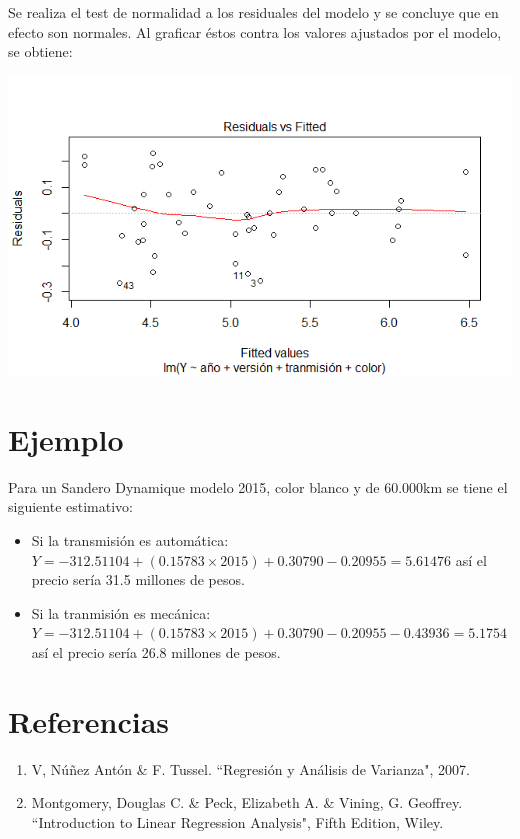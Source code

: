 \documentclass[12pt,a0,portrait]{a0poster}
\begin{document}
\begin{multicols}{2}
Se realiza el test de normalidad a los residuales del modelo y se concluye que en efecto son normales. Al graficar \'estos contra los valores ajustados por el modelo, se obtiene:
\begin{center}
	\includegraphics[scale=1.5]{Residuals}
\end{center}


\section*{\textcolor{ginger}{\huge Ejemplo}}
Para un Sandero Dynamique modelo 2015, color blanco y de $60.000$km se tiene el siguiente estimativo:\\
\begin{itemize}
	\item Si la transmisi\'on es autom\'atica:  $Y=-312.51104+(0.15783\times2015)+0.30790-0.20955 = 5.61476 $ as\'i el precio ser\'ia 31.5 millones de pesos.
	\item Si la tranmisi\'on es mec\'anica: $Y=-312.51104+(0.15783\times2015)+0.30790-0.20955-0.43936 = 5.1754 $ as\'i el precio ser\'ia 26.8 millones de pesos.
\end{itemize}


\section*{\textcolor{ginger}{\huge Referencias}}

\begin{enumerate}
	\item V, N\'u\~nez Ant\'on \& F. Tussel. ``Regresi\'on y An\'alisis de Varianza", 2007.
	\item Montgomery, Douglas C. \& Peck, Elizabeth A. \& Vining, G. Geoffrey. ``Introduction to Linear Regression Analysis", Fifth Edition, Wiley.
\end{enumerate}

\end{multicols}
\end{document}
